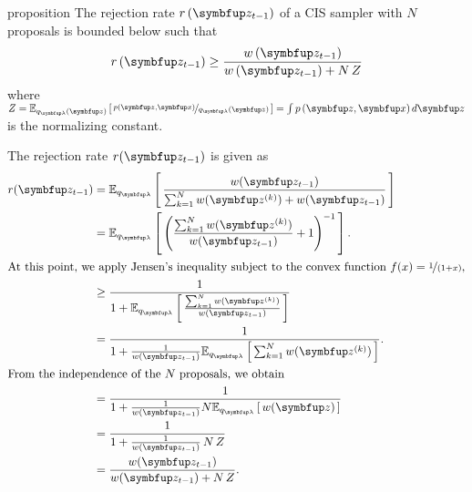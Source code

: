 
\begin{theoremEnd}[]{proposition}\label{thm:cis_bound}
  The rejection rate \(r\,(\vz_{t-1})\) of a CIS sampler with \(N\) proposals is bounded below such that
  \[
  r\,(\vz_{t-1}) \geq \frac{w\,(\vz_{t-1})}{w\,(\vz_{t-1}) + N\,Z}
  \]
  where \(Z=\Esub{q_{\vlambda}(\vz)}{\nicefrac{p(\vz,\vx)}{q_{\vlambda}(\vz)}} = \int p\,(\vz,\vx)\,d\vz\) is the normalizing constant.
\end{theoremEnd}
\begin{proofEnd}
  The rejection rate \(r(\vz_{t-1})\) is given as
  \begin{align}
    r(\vz_{t-1})
    &= \Esub{q_{\vlambda}}{ \frac{w(\vz_{t-1})}{ \sum^{N}_{k=1} w(\vz^{(k)}) + w(\vz_{t-1})} } \\
    &= \Esub{q_{\vlambda}}{ {\left( \frac{\sum^{N}_{k=1} w(\vz^{(k)}) }{ w(\vz_{t-1}) } + 1 \right)}^{-1} }.  \\
\intertext{At this point, we apply Jensen's inequality subject to the convex function \(f(x) = \nicefrac{1}{(1 + x)}\),}
    &\geq \frac{1}{1 + \Esub{q_{\vlambda}}{ \frac{\sum^{N}_{k=1} w(\vz^{(k)})}{w(\vz_{t-1})} } } \\
    &=    \frac{1}{1 + \frac{1}{w(\vz_{t-1})} \Esub{q_{\vlambda}}{ \sum^{N}_{k=1} w(\vz^{(k)}) } }. \\
\intertext{From the independence of the \(N\) proposals, we obtain}
    &=    \frac{1}{1 + \frac{1}{w(\vz_{t-1})} N \Esub{q_{\vlambda}}{ w(\vz) } } \\
    &=    \frac{1}{1 + \frac{1}{w(\vz_{t-1})}\,N\,Z } \\
    &=    \frac{w(\vz_{t-1})}{w(\vz_{t-1}) + N\,Z}.
  \end{align}
\end{proofEnd}

